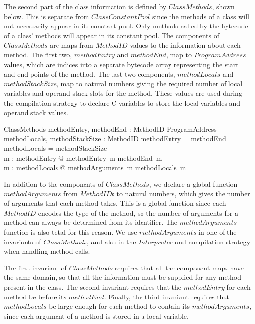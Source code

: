 The second part of the class information is defined by $ClassMethods$,
shown below.
This is separate from $ClassConstantPool$ since the methods of a class
will not necessarily appear in its constant pool.
Only methods called by the bytecode of a class' methods will appear in
its constant pool.
The components of $ClassMethods$ are maps from $MethodID$ values to
the information about each method.
The first two, $methodEntry$ and $methodEnd$, map to $ProgramAddress$
values, which are indices into a separate bytecode array representing
the start and end points of the method.
The last two components, $methodLocals$ and $methodStackSize$, map to
natural numbers giving the required number of local variables and
operand stack slots for the method.
These values are used during the compilation strategy to declare C
variables to store the local variables and operand stack values.
\begin{schema}{ClassMethods}
  methodEntry, methodEnd : MethodID \pfun ProgramAddress \\
  methodLocals, methodStackSize : MethodID \pfun \nat
\where
  \dom methodEntry = \dom methodEnd = \dom methodLocals = \dom methodStackSize \\
  \forall m : \dom methodEntry @ methodEntry~m \leq methodEnd~m \\
  \forall m : \dom methodLocals @ methodArguments~m \leq methodLocals~m
\end{schema}
In addition to the components of $ClassMethods$, we declare a global
function $methodArguments$ from $MethodID$s to natural numbers, which
gives the number of arguments that each method takes.
This is a global function since each $MethodID$ encodes the type of
the method, so the number of arguments for a method can always be
determined from its identifier.
The $methodArguments$ function is also total for this reason.
We use $methodArguments$ in one of the invariants of $ClassMethods$,
and also in the $Interpreter$ and compilation strategy when handling
method calls.

The first invariant of $ClassMethods$ requires that all the component
maps have the same domain, so that all the information must be
supplied for any method present in the class.
The second invariant requires that the $methodEntry$ for each method
be before its $methodEnd$.
Finally, the third invariant requires that $methodLocals$ be large
enough for each method to contain its $methodArguments$, since each
argument of a method is stored in a local variable.

